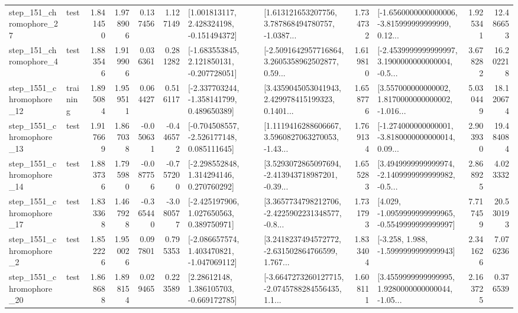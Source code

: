 \begin{tabular}{llrrrrllrlrr}
  step\_151\_chromophore\_27 &      test &      1.841450 &    1.978906 &      0.137456 &  1.127149 &    [1.001813117, 2.428324198, -0.151494372] &  [1.613121653207756, 3.787868494780757, -1.0387... &       1.734732 &  [-1.6560000000000006, -3.815999999999999, 0.12... &            1.925341 &         12.486653 \\
   step\_151\_chromophore\_4 &      test &      1.883546 &    1.919906 &      0.036361 &  0.281282 &   [-1.683553845, 2.121850131, -0.207728051] &  [-2.5091642957716864, 3.2605358962502877, 0.59... &       1.619810 &  [-2.4539999999999997, 3.1900000000000004, -0.5... &            3.678282 &         16.202218 \\
 step\_1551\_chromophore\_12 &  training &      1.895084 &    1.959511 &      0.064427 &  0.516117 &   [-2.337703244, -1.358141799, 0.489650389] &  [3.4359045053041943, 2.429978415199323, 0.1401... &       1.658776 &  [3.557000000000002, 1.8170000000000002, -1.016... &            5.030449 &         18.120674 \\
 step\_1551\_chromophore\_13 &      test &      1.917669 &    1.867038 &     -0.050631 & -0.446572 &   [-0.704508557, -2.526177148, 0.085111645] &  [1.1119416288606667, 3.5960827063270053, -1.43... &       1.769134 &  [-1.274000000000001, -3.8180000000000014, 0.09... &            2.903930 &         19.484084 \\
 step\_1551\_chromophore\_14 &      test &      1.883736 &    1.795980 &     -0.087756 & -0.757200 &    [-2.298552848, 1.314294146, 0.270760292] &  [3.5293072865097694, -2.413943718987201, -0.39... &       1.655283 &  [3.4949999999999974, -2.1409999999999982, -0.5... &            2.868925 &          4.023332 \\
 step\_1551\_chromophore\_17 &      test &      1.833368 &    1.467928 &     -0.365440 & -3.080577 &    [-2.425197906, 1.027650563, 0.389750971] &  [3.3657734798212706, -2.4225902231348577, -0.8... &       1.731793 &  [4.029, -1.0959999999999965, -0.5549999999999997] &            7.717459 &         20.530193 \\
  step\_1551\_chromophore\_2 &      test &      1.852226 &    1.950026 &      0.097801 &  0.795353 &   [-2.086657574, 1.403470821, -1.047069112] &  [3.2418237494572772, -2.631502864766599, 1.767... &       1.833404 &               [-3.258, 1.988, -1.5999999999999943] &            2.341626 &          7.076236 \\
 step\_1551\_chromophore\_20 &      test &      1.868688 &    1.898154 &      0.029465 &  0.223589 &     [2.28612148, 1.386105703, -0.669172785] &  [-3.6647273260127715, -2.0745788284556435, 1.1... &       1.608111 &  [3.4559999999999995, 1.9280000000000044, -1.05... &            2.163725 &          0.376539 \\

\end{tabular}
